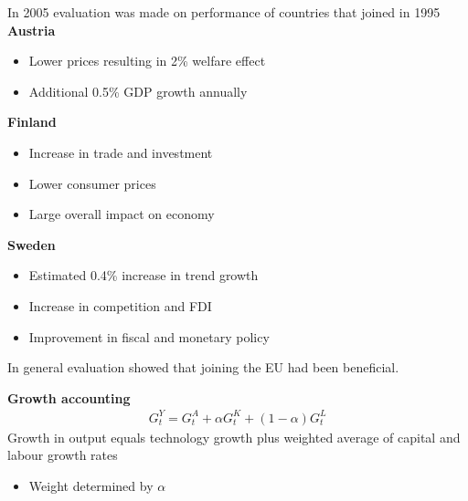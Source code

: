 \documentclass{beamer}
\begin{document}
\begin{frame}
  In 2005 evaluation was made on performance of countries that joined in 1995\\
  \textbf{Austria}
  \begin{itemize}
    \item Lower prices resulting in 2\% welfare effect
    \item Additional 0.5\% GDP growth annually
  \end{itemize}
  \textbf{Finland}
  \begin{itemize}
    \item Increase in trade and investment
    \item Lower consumer prices
    \item Large overall impact on economy
  \end{itemize}
  \textbf{Sweden}
  \begin{itemize}
    \item Estimated 0.4\% increase in trend growth
    \item Increase in competition and FDI
    \item Improvement in fiscal and monetary policy
  \end{itemize}
  \medskip
  In general evaluation showed that joining the EU had been beneficial. 
\end{frame}

\begin{frame}
  \textbf{Growth accounting}
  \begin{align}
    G_t^Y=G_t^A + \alpha G_t^K + (1-\alpha)G_t^L
  \end{align}  
  \medskip
  Growth in output equals technology growth plus weighted average of capital and labour growth rates
  \begin{itemize}
    \item Weight determined by $\alpha$
  \end{itemize}
\end{frame}
\end{document}
